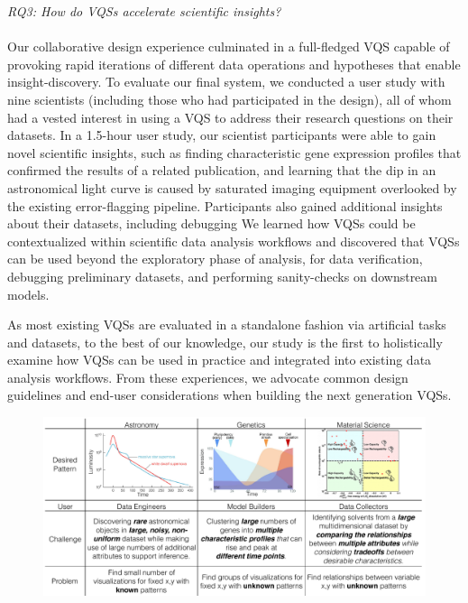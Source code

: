 \emph{RQ3: How do VQSs accelerate scientific insights?}\\
\\ Our collaborative design experience culminated in a full-fledged VQS capable of provoking rapid iterations of different data operations and hypotheses that enable insight-discovery. To evaluate our final system, we conducted a user study with nine scientists (including those who had participated in the design), all of whom had a vested interest in using a VQS to address their research questions on their datasets. In a 1.5-hour user study, our scientist participants were able to gain novel scientific insights, such as %
finding characteristic gene expression profiles that confirmed the results of a related publication, and learning that the dip in an astronomical light curve is caused by saturated imaging equipment overlooked by the existing error-flagging pipeline. 
Participants also gained additional insights about their datasets, including debugging 
We learned how VQSs could be contextualized within scientific data analysis workflows and discovered that VQSs can be used beyond the exploratory phase of analysis, for data verification, debugging preliminary datasets, and performing sanity-checks on downstream models.
\par As most existing VQSs are evaluated in a standalone fashion via artificial tasks and datasets, to the best of our knowledge, our study is the first to holistically examine how VQSs can be used in practice and integrated into existing data analysis workflows. From these experiences, we advocate common design guidelines and end-user considerations when building the next generation VQSs.
\begin{figure}[ht!]
\centering
\vspace{-15pt}
\includegraphics[width=0.8\linewidth]{figures/sci_challenge_tbl.pdf}
\vspace{-6pt}
\label{example}
\vspace{-10pt}
\end{figure}